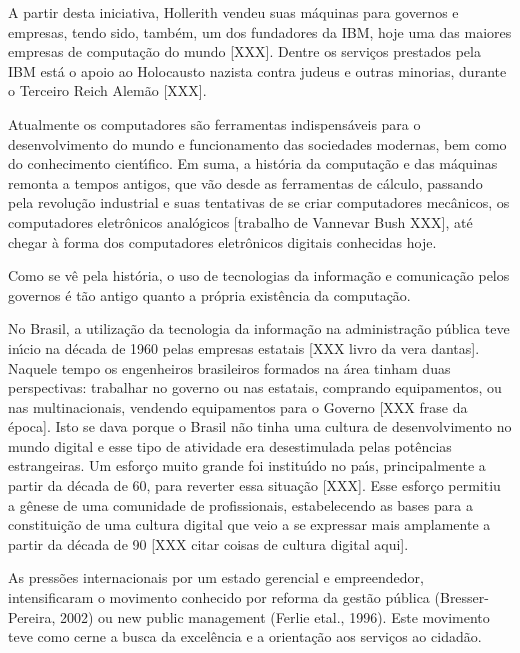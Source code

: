 \documentclass[
12pt,		%
openright,	%
twoside,  %
a4paper,			%
chapter=TITLE,		%
english,			%
french,				%
spanish,			%
brazil				%
]{USPSC-classe/USPSC}
\begin{document}
A partir desta iniciativa, Hollerith vendeu suas m\'aquinas para governos e empresas, tendo sido, tamb\'em, um dos fundadores da IBM, hoje uma das maiores empresas de computa\c{c}\~ao do mundo [XXX]. Dentre os servi\c{c}os prestados pela IBM est\'a o apoio ao Holocausto nazista contra judeus e outras minorias, durante o Terceiro Reich Alem\~ao [XXX].


Atualmente os computadores s\~ao ferramentas indispens\'aveis para o desenvolvimento do mundo e funcionamento das sociedades modernas, bem como do conhecimento cient\'{\i}fico. Em suma, a hist\'oria da computa\c{c}\~ao e das m\'aquinas remonta a tempos antigos, que v\~ao desde as ferramentas de c\'alculo, passando pela revolu\c{c}\~ao industrial e suas tentativas de se criar computadores mec\^anicos, os computadores eletr\^onicos anal\'ogicos [trabalho de Vannevar Bush XXX], at\'e chegar \`a forma dos computadores eletr\^onicos digitais conhecidas hoje.


Como se v\^e pela hist\'oria, o uso de tecnologias da informa\c{c}\~ao e comunica\c{c}\~ao pelos governos \'e t\~ao antigo quanto a pr\'opria exist\^encia da computa\c{c}\~ao.


No Brasil, a utiliza\c{c}\~ao da tecnologia da informa\c{c}\~ao na administra\c{c}\~ao p\'ublica teve in\'{\i}cio na d\'ecada de 1960 pelas empresas estatais [XXX livro da vera dantas]. Naquele tempo os engenheiros brasileiros formados na \'area tinham duas perspectivas: trabalhar no governo ou nas estatais, comprando equipamentos, ou nas multinacionais, vendendo equipamentos para o Governo [XXX frase da \'epoca]. Isto se dava porque o Brasil n\~ao tinha uma cultura de desenvolvimento no mundo digital e esse tipo de atividade era desestimulada pelas pot\^encias estrangeiras. Um esfor\c{c}o muito grande foi institu\'{\i}do no pa\'{\i}s, principalmente a partir da d\'ecada de 60, para reverter essa situa\c{c}\~ao [XXX]. Esse esfor\c{c}o permitiu a g\^enese de uma comunidade de profissionais, estabelecendo as bases para a constitui\c{c}\~ao de uma \textquotedbl cultura digital que veio a se expressar mais amplamente a partir da d\'ecada de 90 [XXX citar coisas de cultura digital aqui].


As press\~oes internacionais por um estado \textquotedbl gerencial e empreendedor, intensificaram o movimento conhecido por reforma da gest\~ao p\'ublica (Bresser-Pereira, 2002) ou new public management (Ferlie etal., 1996). Este movimento teve como cerne a \textquotedbl busca da excel\^encia e a orienta\c{c}\~ao aos servi\c{c}os ao cidad\~ao.
\end{document}
